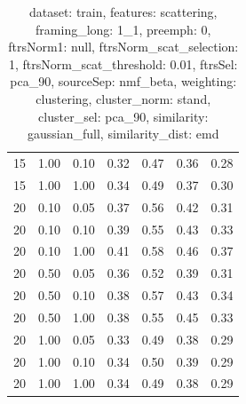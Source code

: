 \begin{table}
\begin{center}
\begin{tabular}{lllcccc}
15 & 1.00 & 0.10 & 0.32 & 0.47 & 0.36 & 0.28 \\ 
15 & 1.00 & 1.00 & 0.34 & 0.49 & 0.37 & 0.30 \\ 
20 & 0.10 & 0.05 & 0.37 & 0.56 & 0.42 & 0.31 \\ 
20 & 0.10 & 0.10 & 0.39 & 0.55 & 0.43 & 0.33 \\ 
20 & 0.10 & 1.00 & 0.41 & 0.58 & 0.46 & 0.37 \\ 
20 & 0.50 & 0.05 & 0.36 & 0.52 & 0.39 & 0.31 \\ 
20 & 0.50 & 0.10 & 0.38 & 0.57 & 0.43 & 0.34 \\ 
20 & 0.50 & 1.00 & 0.38 & 0.55 & 0.45 & 0.33 \\ 
20 & 1.00 & 0.05 & 0.33 & 0.49 & 0.38 & 0.29 \\ 
20 & 1.00 & 0.10 & 0.34 & 0.50 & 0.39 & 0.29 \\ 
20 & 1.00 & 1.00 & 0.34 & 0.49 & 0.38 & 0.29 \\ 
\end{tabular} 
\end{center} 
\caption{dataset: train, features: scattering, framing\_long: 1\_1, preemph: 0, ftrsNorm1: null, ftrsNorm\_scat\_selection: 1, ftrsNorm\_scat\_threshold: 0.01, ftrsSel: pca\_90, sourceSep: nmf\_beta, weighting: clustering, cluster\_norm: stand, cluster\_sel: pca\_90, similarity: gaussian\_full, similarity\_dist: emd} 
\label{datasetrFeaturscFraminlong1_1Preemp0Ftrsnorm1nuFtrsnoscatselect1Ftrsnoscatthresh0.01Ftrsselpc90SourcesepnmbeWeightclClustenormstClusteselpc90SimilagafuSimiladistem} 
\end{table} 
 
